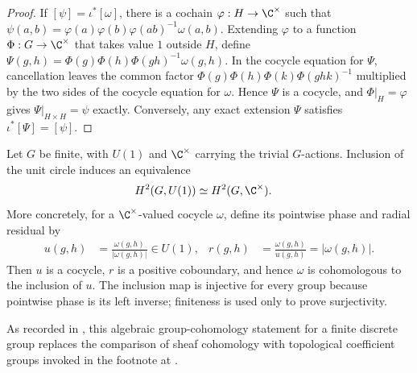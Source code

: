 \begin{proof}\leanok
    If $[\psi]=\iota^*[\omega]$, there is a cochain
    $\varphi:H\to\C^\times$ such that
    $\psi(a,b)=\varphi(a)\varphi(b)\varphi(ab)^{-1}\omega(a,b)$.
    Extending $\varphi$ to a function $\Phi:G\to\C^\times$ that takes value $1$
    outside $H$, define
    $\Psi(g,h)=\Phi(g)\Phi(h)\Phi(gh)^{-1}\omega(g,h)$.
    In the cocycle equation for $\Psi$, cancellation leaves the common
    factor $\Phi(g)\Phi(h)\Phi(k)\Phi(ghk)^{-1}$ multiplied by the two sides
    of the cocycle equation for $\omega$. Hence $\Psi$ is a cocycle, and
    $\Phi|_H=\varphi$ gives $\Psi|_{H\times H}=\psi$ exactly.
    Conversely, any exact extension $\Psi$ satisfies
    $\iota^*[\Psi]=[\psi]$.
\end{proof}

\begin{lemma}
    \label{thm:mpug_circle_complex_units_h2}
    \leanok
    Let $G$ be finite, with $U(1)$ and $\C^\times$ carrying the trivial
    $G$-actions.  Inclusion of the unit circle induces an equivalence
    \begin{align}
        H^2(G,U(1))
         & \simeq H^2(G,\C^\times).
        \label{eq:mpug_circle_complex_units_h2}
    \end{align}
    More concretely, for a $\C^\times$-valued cocycle $\omega$, define its
    pointwise phase and radial residual by
    \begin{align}
        u(g,h)
         & =\frac{\omega(g,h)}{|\omega(g,h)|}\in U(1),
         &
        r(g,h)
         & =\frac{\omega(g,h)}{u(g,h)}=|\omega(g,h)|.
        \label{eq:mpug_circle_phase_residual}
    \end{align}
    Then $u$ is a cocycle, $r$ is a positive coboundary, and hence $\omega$
    is cohomologous to the inclusion of $u$.  The inclusion map is injective
    for every group because pointwise phase is its left inverse; finiteness is
    used only to prove surjectivity.

    As recorded in \cite{gap:fbc25_circle_complex_units_cohomology}, this
    algebraic group-cohomology statement for a finite discrete group replaces
    the comparison of sheaf cohomology with topological coefficient groups
    invoked in the footnote at
    \cite[line~1931]{FrancoRubio2025MPUGauging}.
\end{lemma}

